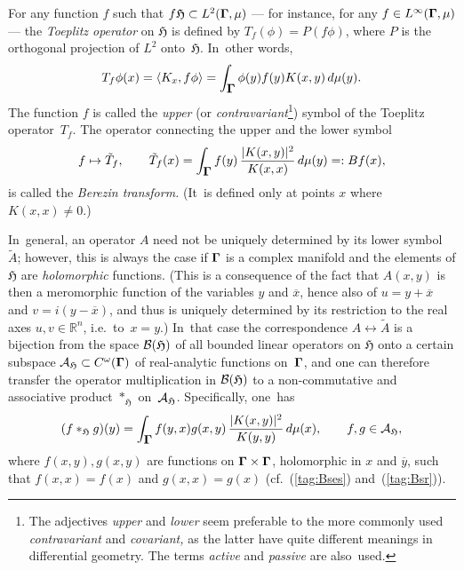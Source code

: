 \documentclass[12pt]{amsart}
\numberwithin{equation}{section}
\theoremstyle{remark}
\newcommand\spr[2]{\langle #1,#2\rangle}
\newcommand\into{\int_\Omg}
\newcommand\AAA{{\Cal A}}
\newcommand\Omg{{\bigam}}   %
\newcommand\HH{\mathfrak H}
\newcommand\RR{\mathbb R}
\newcommand{\bigam}{\mbox{\boldmath $\Gamma$}}
\begin{document}
For any function $f$ such that $f\HH\subset L^2(\Omg,\mu)$ --- for instance,
for any $f\in L^\infty(\Omg,\mu)$ --- the {\it Toeplitz operator\/} on $\HH$ is
defined by $T_f(\phi) = P(f\phi)$, where $P$ is the orthogonal projection of
$L^2$ onto~$\HH$. In~other words,
\begin{equation}  T_f \phi(x) = \spr{K_x}{f\phi} = \into \phi(y) f(y) K(x,y)
\,d\mu(y). \label{tag:Bt}  \end{equation}
The function $f$ is called the {\it upper\/} (or {\it contravariant\/}\footnote
{The adjectives {\it upper\/} and {\it lower\/} seem preferable to the more
commonly used {\it contravariant\/} and {\it covariant,\/} as the latter have
quite different meanings in differential geometry. The terms {\it active\/} and
{\it passive\/} are also~used.}) symbol of the Toeplitz operator~$T_f$.
The operator connecting the upper and the lower symbol
\begin{equation}  f\mapsto \tilde T_f, \qquad \tilde T_f(x) = \into f(y) \,
\frac{|K(x,y)|^2} {K(x,x)} \,d\mu(y) =: Bf(x) ,  \label{tag:Bo}  \end{equation}
is called the {\it Berezin transform.\/} (It~is defined only at points $x$
where $K(x,x)\neq0$.)

In~general, an operator $A$ need not be uniquely determined by its lower
symbol~$\tilde A$; however, this is always the case if $\Omg$ is a complex
manifold and the elements of $\HH$ are {\it holomorphic} functions. (This
is a consequence of the fact that $A(x,y)$ is then a meromorphic function of
the variables $y$ and $\overline x$, hence also of $u=y+\overline x$ and
$v=i(y-\overline x)$, and thus is uniquely determined by its restriction to the
real axes $u,v\in\RR^n$, i.e.~to~$x=y$.) In~that case the correspondence
$A\leftrightarrow\tilde A$ is a bijection from the space $\Cal B(\HH)$ of all
bounded linear operators on $\HH$ onto a certain subspace $\AAA_\HH\subset
C^\omega(\Omg)$ of real-analytic functions on~$\Omg$, and one can therefore
transfer the operator multiplication in $\Cal B(\HH)$ to a non-commutative and
associative product $*_\HH$ on~$\AAA_\HH$. Specifically, one~has
\begin{equation}  (f *_\HH g)(y) = \into f(y,x)g(x,y) \,
\frac{|K(x,y)|^2}{K(y,y)} \, d\mu(x), \qquad f,g\in\AAA_\HH,  \label{tag:Bpro}
\end{equation}
where $f(x,y),g(x,y)$ are functions on $\Omg\times\Omg$, holomorphic in $x$
and $\overline y$, such that $f(x,x)=f(x)$ and $g(x,x)=g(x)$
(cf.~(\ref{tag:Bses}) and~(\ref{tag:Bsr})).
\end{document}
